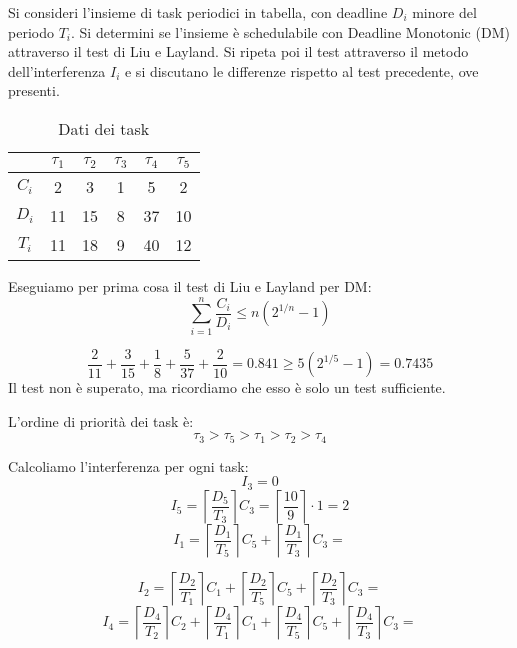 \begin{Esercizio9}

  

Si consideri l'insieme di task periodici in tabella, 
con deadline $D_i$ minore del periodo $T_i$. 
Si determini se l'insieme è schedulabile con 
Deadline Monotonic (DM) attraverso il test di Liu e Layland. 
Si ripeta poi il test attraverso il metodo dell'interferenza $I_i$ e 
si discutano le differenze rispetto al test precedente, ove presenti.

\begin{table}[H]
\centering
\caption{Dati dei task}
\begin{tabular}{|c|c|c|c|c|c|}
\hline
 & $\tau_1$ & $\tau_2$ & $\tau_3$ & $\tau_4$ & $\tau_5$ \\
\hline
$C_i$ & 2 & 3 & 1 & 5 & 2 \\
\hline
$D_i$ & 11 & 15 & 8 & 37 & 10 \\
\hline
$T_i$ & 11 & 18 & 9 & 40 & 12 \\
\hline
\end{tabular}
\label{tab:dm_tasks}
\end{table}


Eseguiamo per prima cosa il test di Liu e Layland per DM:
\[
\sum_{i=1}^{n} \frac{C_{i}}{D_{i}} \le n (2^{1/n} - 1)
\]

\[\frac{2}{11} + \frac{3}{15} + \frac{1}{8} + \frac{5}{37} + \frac{2}{10} 
= 0.841
\ge 5 (2^{1/5} - 1) = 0.7435\]
Il test non è superato, ma ricordiamo che esso è solo un test sufficiente.



L'ordine di priorità dei task è:
\[
\tau_{3} > \tau_{5} > \tau_{1} > \tau_{2} > \tau_{4}
\]



Calcoliamo l'interferenza per ogni task:
\[ I_{3} = 0 \]
\[ I_{5} = \left \lceil \frac{D_{5}}{T_{3}} \right \rceil C_{3} = \left \lceil \frac{10}{9} \right \rceil  \cdot 1 = 2 \]
\[I_{1} = \left \lceil \frac{D_{1}}{T_{5}} \right \rceil C_{5}  + \left \lceil \frac{D_{1}}{T_{3}} \right \rceil C_{3}
=    \]

\[I_{2} = \left \lceil \frac{D_{2}}{T_{1}} \right \rceil C_{1} + \left \lceil \frac{D_{2}}{T_{5}} \right \rceil C_{5} 
 + \left \lceil \frac{D_{2}}{T_{3}} \right \rceil C_{3}
=   \]
\[I_{4} = \left \lceil \frac{D_{4}}{T_{2}} \right \rceil C_{2}  + 
\left \lceil \frac{D_{4}}{T_{1}} \right \rceil C_{1} + \left \lceil \frac{D_{4}}{T_{5}} \right \rceil C_{5} 
 + \left \lceil \frac{D_{4}}{T_{3}} \right \rceil C_{3}
=   \]


\end{Esercizio9}